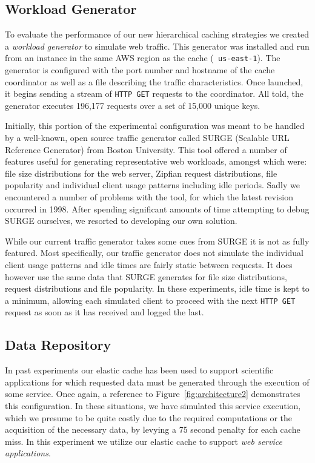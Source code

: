 \subsection{Workload Generator} %
\label{sub:work_generator}
To evaluate the performance of our new hierarchical caching strategies we
created a \emph{workload generator} to simulate web traffic. This generator was
installed and run from an instance in the same AWS region as the cache ({\tt
us-east-1}). The generator is configured with the port number and hostname of
the cache coordinator as well as a file describing the traffic characteristics.
Once launched, it begins sending a stream of {\tt HTTP GET} requests to the
coordinator. All told, the generator executes 196,177 requests over a set of
15,000 unique keys.

Initially, this portion of the experimental configuration was meant to be
handled by a well-known, open source traffic generator called SURGE (Scalable
URL Reference Generator) from Boston University\cite{surge}. This tool offered
a number of features useful for generating representative web workloads,
amongst which were: file size distributions for the web server, Zipfian request
distributions, file popularity and individual client usage patterns including
idle periods. Sadly we encountered a number of problems with the tool, for
which the latest revision occurred in 1998. After spending significant amounts
of time attempting to debug SURGE ourselves, we resorted to developing our own
solution.

While our current traffic generator takes some cues from SURGE it is not as
fully featured. Most specifically, our traffic generator does not simulate the
individual client usage patterns and idle times are fairly static between
requests. It does however use the same data that SURGE generates for file size
distributions, request distributions and file popularity. In these experiments,
idle time is kept to a minimum, allowing each simulated client to proceed with
the next {\tt HTTP GET} request as soon as it has received and logged the
last.


\subsection{Data Repository} %
\label{sub:data_repository}
In past experiments our elastic cache has been used to support scientific
applications for which requested data must be generated through the execution
of some service. Once again, a reference to Figure~\ref{fig:architecture2}
demonstrates this configuration. In these situations, we have simulated this
service execution, which we presume to be quite costly due to the required
computations or the acquisition of the necessary data, by levying a 75 second
penalty for each cache miss. In this experiment we utilize our elastic cache to
support \emph{web service applications}.

